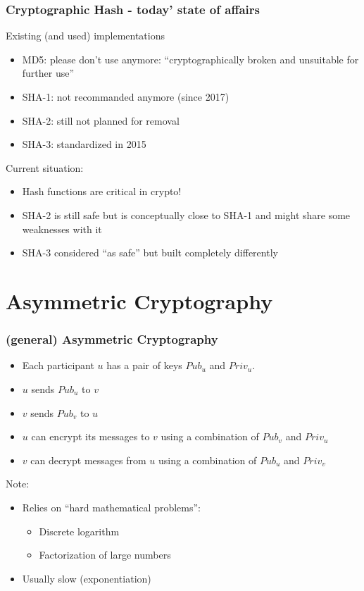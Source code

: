 \documentclass[
hyperref={pdfpagelabels=false}
,xcolor=table
]
{beamer}
\begin{document}
\begin{frame}
  \frametitle{Cryptographic Hash - today' state of affairs}

  Existing (and used) implementations
  \begin{itemize}
  \item MD5: please don't use anymore: ``cryptographically broken and
    unsuitable for further use''
  \item SHA-1: not recommanded anymore (since 2017)
  \item SHA-2: still not planned for removal
  \item SHA-3: standardized in 2015
  \end{itemize}

  Current situation:
  \begin{itemize}
  \item Hash functions are critical in crypto!
  \item SHA-2 is still safe but is conceptually close to SHA-1 and might share some weaknesses with it
  \item SHA-3 considered ``as safe'' but built completely differently
  \end{itemize}
\end{frame}

\section{Asymmetric Cryptography}



\begin{frame}
  \frametitle{(general) Asymmetric Cryptography}

  \begin{itemize}
  \item Each participant $u$ has a pair of keys $Pub_u$ and $Priv_u$. 
  \item $u$ sends $Pub_u$ to $v$
  \item $v$ sends $Pub_v$ to $u$
  \item $u$ can encrypt its messages to $v$ using a combination of $Pub_v$ and $Priv_u$
  \item $v$ can decrypt messages from $u$ using a combination  of $Pub_u$ and $Priv_v$
  \end{itemize}

  Note:
  \begin{itemize}
  \item Relies on ``hard mathematical problems'':
    \begin{itemize}
    \item Discrete logarithm
    \item Factorization of large numbers
    \end{itemize}
  \item Usually slow (exponentiation)
  \end{itemize}
\end{frame}
\end{document}
